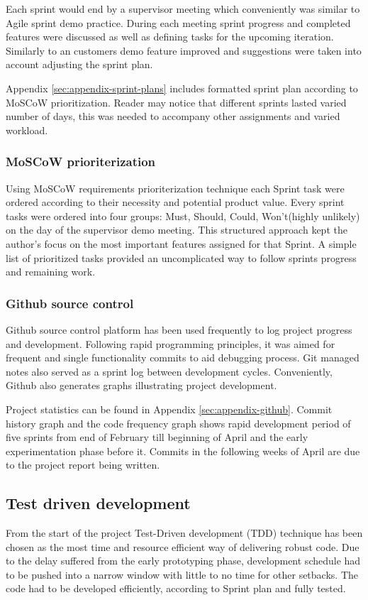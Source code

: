 		Each sprint would end by a supervisor meeting which conveniently was similar to Agile sprint demo practice. During each meeting sprint progress and completed features were discussed as well as defining tasks for the upcoming iteration. Similarly to an customers demo feature improved and suggestions were taken into account adjusting the sprint plan.
		
		Appendix \ref{sec:appendix-sprint-plans} includes formatted sprint plan according to MoSCoW prioritization. Reader may notice that different sprints lasted varied number of days, this was needed to accompany other assignments and varied workload.
	
		\subsubsection{MoSCoW prioriterization}
		Using MoSCoW requirements prioriterization technique each Sprint task were ordered according to their necessity and potential product value. Every sprint tasks were ordered into four groups: Must, Should, Could, Won't(highly unlikely) on the day of the supervisor demo meeting. This structured approach kept the author's focus on the most important features assigned for that Sprint. A simple list of prioritized tasks provided an uncomplicated way to follow sprints progress and remaining work. 
		
		\subsubsection{Github source control}
		Github source control platform has been used frequently to log project progress and development. Following rapid programming principles, it was aimed for frequent and single functionality commits to aid debugging process. Git managed notes also served as a sprint log between development cycles. Conveniently, Github also generates graphs illustrating project development. 
		
		Project statistics can be found in Appendix \ref{sec:appendix-github}. Commit history graph and the code frequency graph shows rapid development period of five sprints from end of February till beginning of April and the early experimentation phase before it. Commits in the following weeks of April are due to the project report being written.
		
		
	\subsection{Test driven development}
		From the start of the project Test-Driven development (TDD) technique has been chosen as the most time and resource efficient way of delivering robust code. Due to the delay suffered from the early prototyping phase, development schedule had to be pushed into a narrow window with little to no time for other setbacks. The code had to be developed efficiently, according to Sprint plan and fully tested. 
		
